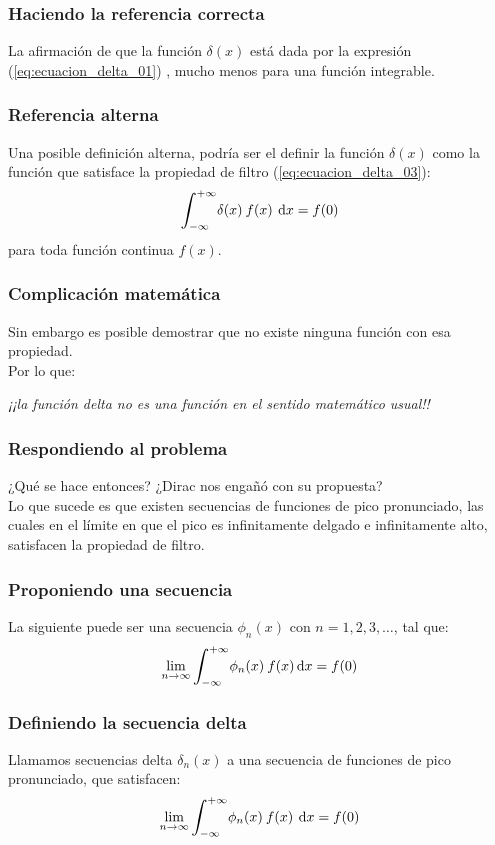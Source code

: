 \documentclass[12pt]{beamer}
\begin{document}
\begin{frame}
\frametitle{Haciendo la referencia correcta}
La afirmación de que la función $\delta (x)$ está dada por la expresión (\ref{eq:ecuacion_delta_01}) \textit{}, mucho menos para una función integrable.
\end{frame}
\begin{frame}
\frametitle{Referencia alterna}
Una posible definición alterna, podría ser el definir la función $\delta (x)$ como la función que satisface la propiedad de filtro (\ref{eq:ecuacion_delta_03}):
\pause
\begin{align*}
\scaleint{6ex}_{\bs -\infty}^{+ \infty} \delta (x) \: f (x) \: \dd{x} = f (0)
\end{align*}
para toda función continua $f (x)$. 
\end{frame}
\begin{frame}
\frametitle{Complicación matemática}
Sin embargo es posible demostrar que no existe ninguna función con esa propiedad.
\\
\bigskip
\pause
Por lo que:
\pause
\begin{center}
\textit{¡¡la función delta no es una función en el sentido matemático usual!!}
\end{center}
\end{frame}
\begin{frame}
\frametitle{Respondiendo al problema}
¿Qué se hace entonces? \pause ¿Dirac nos engañó con su propuesta?
\\
\bigskip
\pause
Lo que sucede es que existen secuencias de funciones de pico pronunciado, las cuales en el límite en que el pico es infinitamente delgado e infinitamente alto, satisfacen la propiedad de filtro.
\end{frame}
\begin{frame}
\frametitle{Proponiendo una secuencia}
La siguiente puede ser una secuencia $\phi_{n} (x)$ con $n = 1, 2, 3, \ldots$, tal que:
\pause
\begin{align*}
\lim_{n \to \infty} \scaleint{6ex}_{\bs -\infty}^{+ \infty} \phi_{n} (x) \: f (x) \dd{x} =  f (0)
\end{align*}
\end{frame}
\begin{frame}
\frametitle{Definiendo la secuencia delta}
Llamamos secuencias delta $\delta_{n} (x)$ a una secuencia de funciones de pico pronunciado, que satisfacen:
\pause
\begin{align*}
\lim_{n \to \infty} \scaleint{6ex}_{\bs -\infty}^{+ \infty} \phi_{n} (x) \: f (x) \: \dd{x} =  f (0)
\end{align*}
\end{frame}
\end{document}
